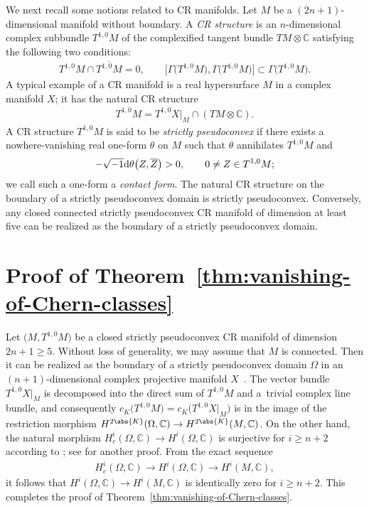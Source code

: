 \documentclass[10pt,a4paper]{amsart}
\numberwithin{equation}{section}
\begin{document}
We next recall some notions related to CR manifolds. Let $M$ be a $(2 n + 1)$-dimensional manifold without boundary. A \emph{CR structure} is an $n$-dimensional complex subbundle $T^{1, 0} M$ of the complexified tangent bundle $T M \otimes \mathbb{C}$ satisfying the following two conditions:
\begin{gather*}
T^{1, 0} M \cap \overline{T^{1, 0} M} = 0, \qquad
\big[\Gamma\big(T^{1,0}M\big), \Gamma\big(T^{1,0}M\big)\big] \subset \Gamma\big(T^{1,0}M\big).
\end{gather*}
A typical example of a CR manifold is a real hypersurface $M$ in a complex manifold $X$; it has the natural CR structure
\begin{gather*}
T^{1, 0} M= T^{1, 0} X |_{M} \cap (T M \otimes \mathbb{C}).
\end{gather*}
A CR structure $T^{1, 0} M$ is said to be \emph{strictly pseudoconvex} if there exists a nowhere-vanishing real one-form $\theta$ on $M$ such that $\theta$ annihilates $T^{1, 0} M$ and
\begin{gather*}
- \sqrt{- 1} {\rm d} \theta \big(Z, \overline{Z}\big) > 0, \qquad 0 \neq Z \in T^{1, 0} M;
\end{gather*}
we call such a one-form a \emph{contact form}. The natural CR structure on the boundary of a strictly pseudoconvex domain is strictly pseudoconvex. Conversely, any closed connected strictly pseudoconvex CR manifold of dimension at least five can be realized as the boundary of a strictly pseudoconvex domain.


\section{Proof of Theorem~\ref{thm:vanishing-of-Chern-classes}} \label{section:proof-of-theorem}

Let $\big(M,T^{1,0} M\big)$ be a closed strictly pseudoconvex CR manifold of dimension $2 n + 1 \geq 5$. Without loss of generality, we may assume that $M$ is connected.
Then it can be realized as the boundary of a strictly pseudoconvex domain $\Omega$ in an $(n + 1)$-dimensional complex projective manifold $X$~\cite[Theorem~8.1]{Lempert95}.
The vector bundle $T^{1, 0} X |_{M}$ is decomposed into the direct sum of $T^{1, 0} M$ and a~trivial complex line bundle, and consequently $c_{K}\big(T^{1,0}M\big) = c_{K}\big(T^{1, 0} X |_{M}\big)$ is in the image of the restriction morphism $H^{2 \abs{K}}(\Omega, \mathbb{C}) \to H^{2 \abs{K}}(M, \mathbb{C})$. On the other hand, the natural morphism $H^{i}_{c}(\Omega, \mathbb{C}) \to H^{i}(\Omega, \mathbb{C})$ is surjective for $i \geq n + 2$ according to \cite[Corollary~4]{Ohsawa82}; see \cite[Lemma]{Bungart92} for another proof. From the exact sequence
\begin{gather*}
H^{i}_{c}(\Omega, \mathbb{C}) \to H^{i}(\Omega, \mathbb{C}) \to H^{i}(M, \mathbb{C}),
\end{gather*}
it follows that $H^{i}(\Omega, \mathbb{C}) \to H^{i}(M, \mathbb{C})$ is identically zero for $i \geq n + 2$. This completes the proof of Theorem~\ref{thm:vanishing-of-Chern-classes}.
\end{document}

